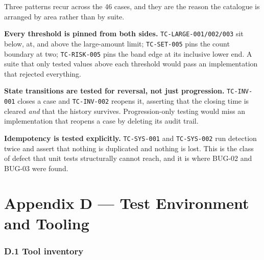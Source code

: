 \documentclass[
  12pt,
]{report}
\begin{document}
Three patterns recur across the 46 cases, and they are the reason the
catalogue is arranged by area rather than by suite.

\textbf{Every threshold is pinned from both sides.}
\texttt{TC-LARGE-001/\allowbreak{}002/\allowbreak{}003} sit below, at, and above the large-amount
limit; \texttt{TC-SET-005} pins the count boundary at two;
\texttt{TC-RISK-005} pins the band edge at its inclusive lower end. A
suite that only tested values above each threshold would pass an
implementation that rejected everything.

\textbf{State transitions are tested for reversal, not just
progression.} \texttt{TC-INV-001} closes a case and \texttt{TC-INV-002}
reopens it, asserting that the closing time is cleared \emph{and} that
the history survives. Progression-only testing would miss an
implementation that reopens a case by deleting its audit trail.

\textbf{Idempotency is tested explicitly.} \texttt{TC-SYS-001} and
\texttt{TC-SYS-002} run detection twice and assert that nothing is
duplicated and nothing is lost. This is the class of defect that unit
tests structurally cannot reach, and it is where BUG-02 and BUG-03 were
found.

\clearpage

\chapter{Appendix D --- Test Environment and
Tooling}\label{appendix-d-test-environment-and-tooling}

\subsection{D.1 Tool inventory}\label{d.1-tool-inventory}
\end{document}
